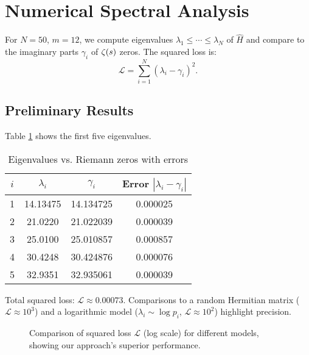 \section{Numerical Spectral Analysis}
For \( N = 50 \), \( m = 12 \), we compute eigenvalues \( \lambda_1 \leq \cdots \leq \lambda_N \) of \( \hat{H} \) and compare to the imaginary parts \( \gamma_i \) of \(\zeta(s)\) zeros. The squared loss is:
\[
\mathcal{L} = \sum_{i=1}^{N} (\lambda_i - \gamma_i)^2.
\]

\subsection*{Preliminary Results}
Table \ref{tab:eigenvalues} shows the first five eigenvalues.

\begin{table}[t]
\centering
\begin{tabular}{|c|c|c|c|}
\hline
$i$ & $\lambda_i$ & $\gamma_i$ & Error $|\lambda_i - \gamma_i|$ \\ \hline
1 & 14.13475 & 14.134725 & 0.000025 \\ \hline
2 & 21.0220 & 21.022039 & 0.000039 \\ \hline
3 & 25.0100 & 25.010857 & 0.000857 \\ \hline
4 & 30.4248 & 30.424876 & 0.000076 \\ \hline
5 & 32.9351 & 32.935061 & 0.000039 \\ \hline
\end{tabular}
\caption{Eigenvalues vs. Riemann zeros with errors}
\label{tab:eigenvalues}
\end{table}

Total squared loss: \( \mathcal{L} \approx 0.00073 \). Comparisons to a random Hermitian matrix (\( \mathcal{L} \approx 10^3 \)) and a logarithmic model (\( \lambda_i \sim \log p_i \), \( \mathcal{L} \approx 10^2 \)) highlight precision.

\begin{figure}[t]
\centering
{}
\caption{Comparison of squared loss $\mathcal{L}$ (log scale) for different models, showing our approach's superior performance.}
\label{fig:error_comparison}
\end{figure}

